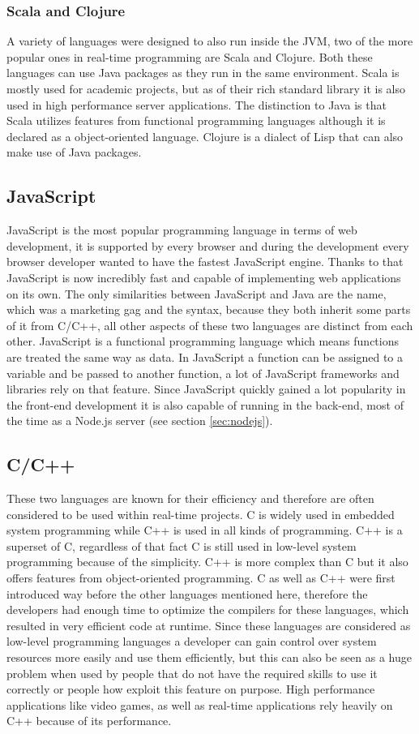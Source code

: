 \subsubsection{Scala and Clojure}
A variety of languages were designed to also run inside the JVM, two of the more popular ones in real-time programming are Scala and Clojure. Both these languages can use Java packages as they run in the same environment. Scala is mostly used for academic projects, but as of their rich standard library it is also used in high performance server applications. The distinction to Java is that Scala utilizes features from functional programming languages although it is declared as a object-oriented language. Clojure is a dialect of Lisp that can also make use of Java packages.

\subsection{JavaScript}
JavaScript is the most popular programming language in terms of web development, it is supported by every browser and during the development every browser developer wanted to have the fastest JavaScript engine. Thanks to that JavaScript is now incredibly fast and capable of implementing web applications on its own. The only similarities between JavaScript and Java are the name, which was a marketing gag and the syntax, because they both inherit some parts of it from C/C++, all other aspects of these two languages are distinct from each other. JavaScript is a functional programming language which means functions are treated the same way as data. In JavaScript a function can be assigned to a variable and be passed to another function, a lot of JavaScript frameworks and libraries rely on that feature. Since JavaScript quickly gained a lot popularity in the front-end development it is also capable of running in the back-end, most of the time as a Node.js server (see section \vref{sec:nodejs}).

\subsection{C/C++}
These two languages are known for their efficiency and therefore are often considered to be used within real-time projects. C is widely used in embedded system programming while C++ is used in all kinds of programming. C++ is a superset of C, regardless of that fact C is still used in low-level system programming because of the simplicity. C++ is more complex than C but it also offers features from object-oriented programming. C as well as C++ were first introduced way before the other languages mentioned here, therefore the developers had enough time to optimize the compilers for these languages, which resulted in very efficient code at runtime. Since these languages are considered as low-level programming languages a developer can gain control over system resources more easily and use them efficiently, but this can also be seen as a huge problem when used by people that do not have the required skills to use it correctly or people how exploit this feature on purpose. High performance applications like video games, as well as real-time applications rely heavily on C++ because of its performance.

